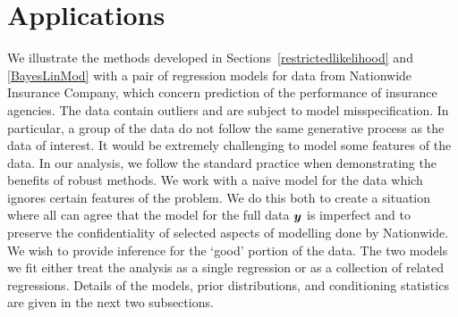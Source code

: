 \documentclass[12pt]{article}
\newcommand{\by}{\mbox{\boldmath $y$}}
\begin{document}
\section{Applications}
\label{Applications}
We illustrate the methods developed in Sections~\ref{restrictedlikelihood} and \ref{BayesLinMod} with a pair of regression models for 
data from Nationwide Insurance Company, which concern prediction of
the performance of insurance agencies.
The data contain outliers and are subject to model misspecification.  
In particular, a group of the data do not follow the same generative process as the data of interest.  It would be 
extremely challenging to model some features of the data.  
In our analysis, we follow the standard practice when demonstrating the benefits of robust 
methods.  We work with a naive model for the data which ignores certain features of the problem.  We
do this both to create a situation where all can agree that the model for the full data $\by$ is imperfect
and to preserve the confidentiality of selected aspects of modelling done by Nationwide.  
We wish to provide inference for the `good' portion of the data.  The two models we fit either treat the analysis
as a single regression or as a collection of related regressions.  Details of the models, prior distributions, 
and conditioning statistics are given in the next two subsections.  

\end{document}

